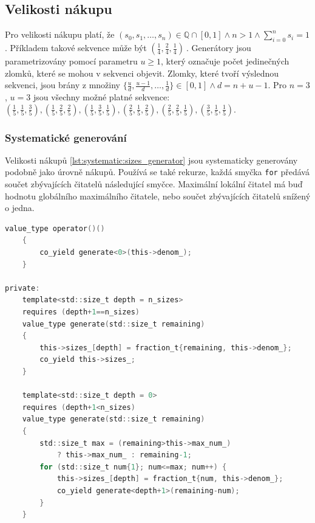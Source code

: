 \subsection{Velikosti nákupu}
Pro velikosti nákupu platí, že $ (s_0, s_1,\dots,s_n) \in \mathbb{Q} \cap [0, 1] \land n>1 \land \sum_{i=0}^{n} s_i = 1 $.
Příkladem takové sekvence může být $ (\frac{1}{4}, \frac{2}{4}, \frac{1}{4})\ $.
Generátory jsou parametrizovány pomocí parametru $u\geq 1$, který označuje počet jedinečných zlomků, které se mohou v sekvenci objevit.
Zlomky, které tvoří výslednou sekvenci, jsou brány z množiny $\{\frac{u}{d}, \frac{u-1}{d},\dots, \frac{1}{d}\} \in [0, 1] \land d=n+u-1$.
Pro $n=3$, $u=3$ jsou všechny možné platné sekvence: $(\frac{1}{5}, \frac{1}{5}, \frac{3}{5}), (\frac{1}{5}, \frac{2}{5}, \frac{2}{5}), (\frac{1}{5}, \frac{3}{5}, \frac{1}{5}), (\frac{2}{5}, \frac{1}{5}, \frac{2}{5}), (\frac{2}{5}, \frac{2}{5}, \frac{1}{5}), (\frac{3}{5}, \frac{1}{5}, \frac{1}{5})$.

\subsubsection{Systematické generování}
Velikosti nákupů \ref{lst:systematic:sizes_generator} jsou systematicky generovány podobně jako úrovně nákupů.
Používá se také rekurze, každá smyčka \texttt{for} předává součet zbývajících čitatelů následující smyčce.
Maximální lokální čitatel má buď hodnotu globálního maximálního čitatele, nebo součet zbývajících čitatelů snížený o jedna.

\begin{lstlisting}[caption={~Metody pro systematické generování velikostí nákupu},label={lst:systematic:sizes_generator},captionpos=t,abovecaptionskip=-\medskipamount,belowcaptionskip=\medskipamount,language=C]
    value_type operator()()
    {
        co_yield generate<0>(this->denom_);
    }

private:
    template<std::size_t depth = n_sizes>
    requires (depth+1==n_sizes)
    value_type generate(std::size_t remaining)
    {
        this->sizes_[depth] = fraction_t{remaining, this->denom_};
        co_yield this->sizes_;
    }

    template<std::size_t depth = 0>
    requires (depth+1<n_sizes)
    value_type generate(std::size_t remaining)
    {
        std::size_t max = (remaining>this->max_num_)
            ? this->max_num_ : remaining-1;
        for (std::size_t num{1}; num<=max; num++) {
            this->sizes_[depth] = fraction_t{num, this->denom_};
            co_yield generate<depth+1>(remaining-num);
        }
    }
\end{lstlisting}

